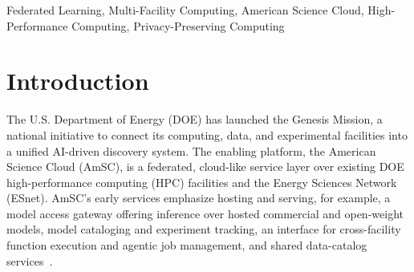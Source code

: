 \documentclass[conference]{IEEEtran}
\begin{document}
\begin{IEEEkeywords}
Federated Learning, Multi-Facility Computing, American Science Cloud, High-Performance Computing, Privacy-Preserving Computing
\end{IEEEkeywords}

\section{Introduction}

The U.S. Department of Energy (DOE) has launched the Genesis Mission, a national initiative to connect its computing, data, and experimental facilities into a unified AI-driven discovery system. The enabling platform, the American Science Cloud (AmSC), 
is a federated, cloud-like service layer over existing DOE high-performance computing (HPC) facilities and the Energy Sciences Network (ESnet). AmSC's early services emphasize hosting and serving, for example, a model access gateway offering inference over hosted commercial and open-weight models, model cataloging and experiment tracking, an interface for cross-facility function execution and agentic job management, and shared data-catalog services~\cite{amscdocshome2026}.
\end{document}
